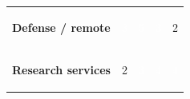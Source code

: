 \documentclass[10pt,a4paper]{article}
\begin{document}
{\begin{tabular}{p{38mm}>{\centering\arraybackslash}p{21mm}>{\centering\arraybackslash}p{21mm}>{\centering\arraybackslash}p{21mm}>{\centering\arraybackslash}p{21mm}}
{\bfseries Defense / remote} & \colorbox{BOBlue}{\textcolor{white}{\strut\hspace{5pt}3\hspace{5pt}}} & \colorbox{BOGreen}{\textcolor{white}{\strut\hspace{5pt}5\hspace{5pt}}} & \colorbox{BOBlue}{\textcolor{white}{\strut\hspace{5pt}3\hspace{5pt}}} & \colorbox{BOLight}{\textcolor{BOText}{\strut\hspace{5pt}2\hspace{5pt}}} \\
{\bfseries Research services} & \colorbox{BOLight}{\textcolor{BOText}{\strut\hspace{5pt}2\hspace{5pt}}} & \colorbox{BOBlue}{\textcolor{white}{\strut\hspace{5pt}3\hspace{5pt}}} & \colorbox{BOGreen}{\textcolor{white}{\strut\hspace{5pt}4\hspace{5pt}}} & \colorbox{BOGreen}{\textcolor{white}{\strut\hspace{5pt}4\hspace{5pt}}} \\
\end{tabular}}\par\vspace{2pt}
\end{document}
